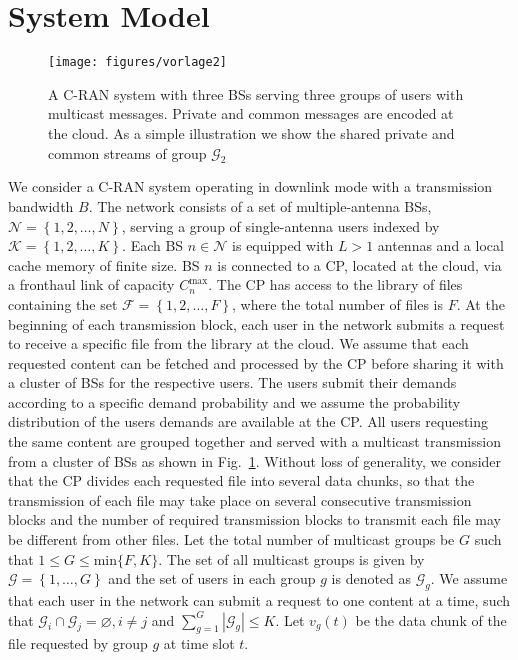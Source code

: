 \documentclass[12pt,draftcls,onecolumn]{IEEEtran}
\let\emptyset\varnothing
\theoremstyle{remark}
\let\emptyset\varnothing
\theoremstyle{definition}
\begin{document}
\section{System Model}\label{sec:SM}

\begin{figure}
	\begin{center}
		\texttt{[image: figures/vorlage2]}
		\caption{A C-RAN system with three BSs serving three groups of users with multicast messages. Private and common messages are encoded at the cloud.  As a simple illustration we show the shared private and common streams of group $\mathcal{G}_2$}
			\label{Fig1}
	\end{center}

   \vspace{-0.5cm}
\end{figure}
We consider a C-RAN system operating in downlink mode with a transmission bandwidth $B$. The network consists of a set of multiple-antenna BSs, $\mathcal{N} = \left\lbrace1,2,\ldots,N\right\rbrace$, serving a group of single-antenna users indexed by $\mathcal{K} = \left\lbrace1,2,\ldots,K\right\rbrace$. Each BS $n \in \mathcal{N}$ is equipped with $L > 1$ antennas and a local cache memory of finite size. BS $n$ is connected to a CP, located at the cloud, via a fronthaul link of capacity $C_n^{\text{max}}$. The CP has access to the library of files containing the set $\mathcal{F} = \left\lbrace1,2,\ldots,F\right\rbrace$, where the total number of files is $F$. At the beginning of each transmission block, each user in the network submits a request to receive a specific file from the library at the cloud. We assume that each requested content can be fetched and processed by the CP before sharing it with a cluster of BSs for the respective users. The users submit their demands according to a specific demand probability and we assume the probability distribution of the users demands are available at the CP. All users requesting the same content are grouped together and served with a multicast transmission from a cluster of BSs as shown in Fig.~\ref{Fig1}. 
Without loss of generality, we consider that the CP divides each requested file into several data chunks, so that the transmission of each file may take place on several consecutive transmission blocks and the number of required transmission blocks to transmit each file may be different from other files. Let the total number of multicast groups be $G$ such that $1 \leq G\leq \text{min}\{F,K\}$. The set of all multicast groups is given by $\mathcal{G} = \left\lbrace 1,\ldots,G\right\rbrace$ and the set of users in each group $g$ is denoted as $\mathcal{G}_g$. We assume that each user in the network can submit a request to one content at a time, such that $\mathcal{G}_i\cap \mathcal{G}_j = \emptyset,  i\neq j $ and $\sum_{g=1}^{G}|\mathcal{G}_g| \leq  K$. Let $v_g(t)$ be the data chunk of the file requested by group $g$ at time slot $t$.
\end{document}
